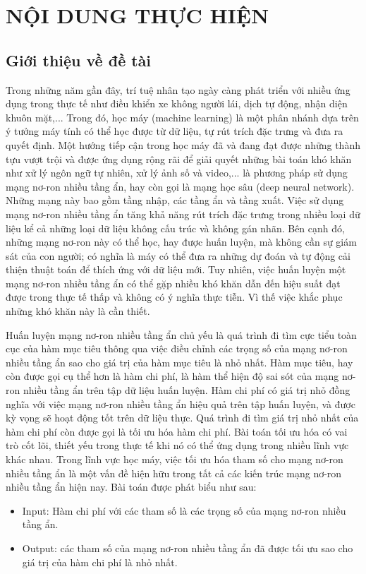 \documentclass{article}[14pt]
\begin{document}
    \section{NỘI DUNG THỰC HIỆN}
    {

    
    \subsection{Giới thiệu về đề tài}

  Trong những năm gần đây, trí tuệ nhân tạo ngày càng phát triển với nhiều ứng dụng trong thực tế như điều khiển xe không người lái, dịch tự động, nhận diện khuôn mặt,... Trong đó, học máy (machine learning) là một phân nhánh dựa trên ý tưởng máy tính có thể học được từ dữ liệu, tự rút trích đặc trưng và đưa ra quyết định. Một hướng tiếp cận trong học máy đã và đang đạt được những thành tựu vượt trội và được ứng dụng rộng rãi để giải quyết những bài toán khó khăn như xử lý ngôn ngữ tự nhiên, xử lý ảnh số và video,... là phương pháp sử dụng mạng nơ-ron nhiều tầng ẩn, hay còn gọi là mạng học sâu (deep neural network). Những mạng này bao gồm tầng nhập, các tầng ẩn và tầng xuất. Việc sử dụng mạng nơ-ron nhiều tầng ẩn tăng khả năng rút trích đặc trưng trong nhiều loại dữ liệu kể cả những loại dữ liệu không cấu trúc và không gán nhãn. Bên cạnh đó, những mạng nơ-ron này có thể học, hay được huấn luyện, mà không cần sự giám sát của con người; có nghĩa là máy có thể đưa ra những dự đoán và tự động cải thiện thuật toán để thích ứng với dữ liệu mới. Tuy nhiên, việc huấn luyện một mạng nơ-ron nhiều tầng ẩn có thể gặp nhiều khó khăn dẫn đến hiệu suất đạt được trong thực tế thấp và không có ý nghĩa thực tiễn. Vì thế việc khắc phục những khó khăn này là cần thiết. \par

  Huấn luyện mạng nơ-ron nhiều tầng ẩn chủ yếu là quá trình đi tìm cực tiểu toàn cục của hàm mục tiêu thông qua việc điều chỉnh các trọng số của mạng nơ-ron nhiều tầng ẩn sao cho giá trị của hàm mục tiêu là nhỏ nhất. Hàm mục tiêu, hay còn được gọi cụ thể hơn là hàm chi phí, là hàm thể hiện độ sai sót của mạng nơ-ron nhiều tầng ẩn trên tập dữ liệu huấn luyện. Hàm chi phí có giá trị nhỏ đồng nghĩa với việc mạng nơ-ron nhiều tầng ẩn hiệu quả trên tập huấn luyện, và được kỳ vọng sẽ hoạt động tốt trên dữ liệu thực. Quá trình đi tìm giá trị nhỏ nhất của hàm chi phí còn được gọi là tối ưu hóa hàm chi phí. Bài toán tối ưu hóa có vai trò cốt lõi, thiết yếu trong thực tế khi nó có thể ứng dụng trong nhiều lĩnh vực khác nhau. Trong lĩnh vực học máy, việc tối ưu hóa tham số cho mạng nơ-ron nhiều tầng ẩn là một vấn đề hiện hữu trong tất cả các kiến trúc mạng nơ-ron nhiều tầng ẩn hiện nay. Bài toán được phát biểu như sau: \par
   \begin{itemize}
      \item Input: Hàm chi phí với các tham số là các trọng số của mạng nơ-ron nhiều tầng ẩn.
      \item Output: các tham số của mạng nơ-ron nhiều tầng ẩn đã được tối ưu sao cho giá trị của hàm chi phí là nhỏ nhất.
    \end{itemize}
    
}
\end{document}

